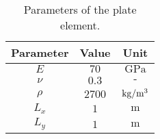 \begin{table}[H]
    \centering
    \begin{tabular}{|c|c|c|}
        \hline
        \textbf{Parameter} & \textbf{Value} & \textbf{Unit}                    \\ \hline
        $E$                & $70$           & $\text{GPa}$                     \\ \hline
        $\nu$              & $0.3$          & $\text{-}$                       \\ \hline
        $\rho$             & $2700$         & $\text{kg/m\textsuperscript{3}}$ \\ \hline
        $L_x$              & $1$            & $\text{m}$                       \\ \hline
        $L_y$              & $1$            & $\text{m}$                       \\ \hline
    \end{tabular}
    \caption{Parameters of the plate element.}
    \label{tab:parameters_of_the_system}
\end{table}
